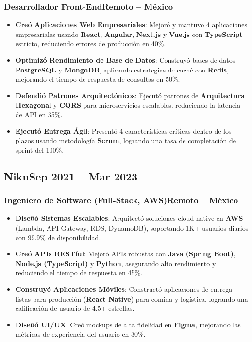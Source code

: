 \documentclass[a4paper,10pt]{article}
\newcommand{\kw}[1]{\textbf{\textcolor{keyword}{#1}}}
\newcommand{\tech}[1]{\textbf{\textcolor{tech}{#1}}}
\begin{document}
\subsubsection*{\small Desarrollador Front-End\hfill Remoto -- México}
\begin{itemize}[noitemsep, leftmargin=*]
    \item \textbf{Creó Aplicaciones Web Empresariales}: Mejoró y mantuvo 4 aplicaciones empresariales usando \tech{React}, \tech{Angular}, \tech{Next.js} y \tech{Vue.js} con \tech{TypeScript} estricto, reduciendo errores de producción en 40\%.
    \item \textbf{Optimizó Rendimiento de Base de Datos}: Construyó bases de datos \kw{PostgreSQL} y \kw{MongoDB}, aplicando estrategias de caché con \tech{Redis}, mejorando el tiempo de respuesta de consultas en 50\%.
    \item \textbf{Defendió Patrones Arquitectónicos}: Ejecutó patrones de \kw{Arquitectura Hexagonal} y \kw{CQRS} para microservicios escalables, reduciendo la latencia de API en 35\%.
    \item \textbf{Ejecutó Entrega Ágil}: Presentó 4 características críticas dentro de los plazos usando metodología \kw{Scrum}, logrando una tasa de completación de sprint del 100\%.
\end{itemize}

\subsection*{\small Niku\hfill\textbf{Sep 2021 -- Mar 2023}}
\subsubsection*{\small Ingeniero de Software (Full-Stack, AWS)\hfill Remoto -- México}
\begin{itemize}[noitemsep, leftmargin=*]
    \item \textbf{Diseñó Sistemas Escalables}: Arquitectó soluciones cloud-native en \tech{AWS} (Lambda, API Gateway, RDS, DynamoDB), soportando 1K+ usuarios diarios con 99.9\% de disponibilidad.
    \item \textbf{Creó APIs RESTful}: Mejoró APIs robustas con \tech{Java (Spring Boot)}, \tech{Node.js (TypeScript)} y \tech{Python}, asegurando alto rendimiento y reduciendo el tiempo de respuesta en 45\%.
    \item \textbf{Construyó Aplicaciones Móviles}: Constructó aplicaciones de entrega listas para producción (\tech{React Native}) para comida y logística, logrando una calificación de usuario de 4.5+ estrellas.
    \item \textbf{Diseñó UI/UX}: Creó mockups de alta fidelidad en \tech{Figma}, mejorando las métricas de experiencia del usuario en 30\%.
\end{itemize}
\end{document}
